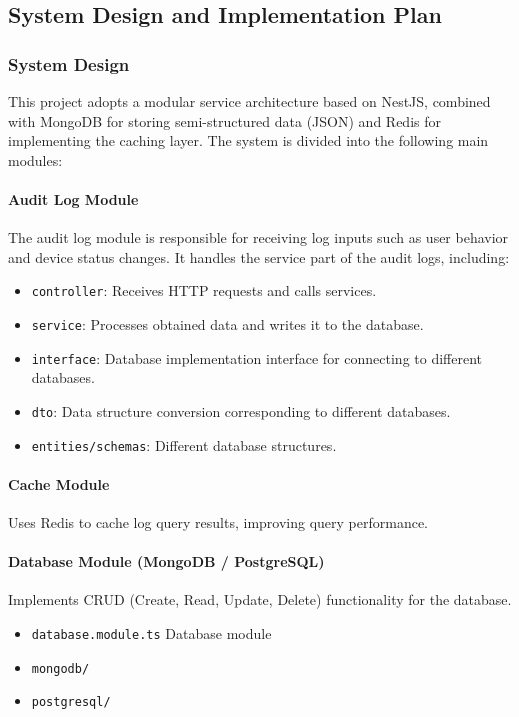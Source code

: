 \documentclass{article}
\begin{document}
\subsection{System Design and Implementation Plan}

\subsubsection{System Design}

This project adopts a modular service architecture based on NestJS, combined with MongoDB for storing semi-structured data (JSON) and Redis for implementing the caching layer. The system is divided into the following main modules:

\paragraph{Audit Log Module}
The audit log module is responsible for receiving log inputs such as user behavior and device status changes. It handles the service part of the audit logs, including:
\begin{itemize}
    \item \texttt{controller}: Receives HTTP requests and calls services.
    \item \texttt{service}: Processes obtained data and writes it to the database.
    \item \texttt{interface}: Database implementation interface for connecting to different databases.
    \item \texttt{dto}: Data structure conversion corresponding to different databases.
    \item \texttt{entities/schemas}: Different database structures.
\end{itemize}

\paragraph{Cache Module}
Uses Redis to cache log query results, improving query performance.

\paragraph{Database Module (MongoDB / PostgreSQL)}
Implements CRUD (Create, Read, Update, Delete) functionality for the database.
\begin{itemize}
    \item \texttt{database.module.ts} Database module
    \item \texttt{mongodb/}
    \item \texttt{postgresql/}
\end{itemize}
\end{document}
